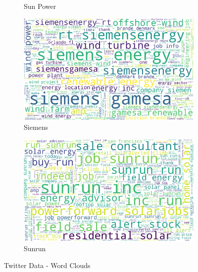 \documentclass[sigconf, nonacm]{acmart}
\begin{document}
\begin{figure}[H]
\begin{subfigure}{0.25\linewidth}
  \caption{Sun Power}
  \label{fig:sfig4}
\end{subfigure}
\begin{subfigure}{0.25\linewidth}
  \centering
  \includegraphics[width=1\linewidth]{images/siemens_gamesa_wordcloud.png}
  \caption{Siemens}
  \label{fig:sfig5}
\end{subfigure}
\begin{subfigure}{0.25\linewidth}
  \centering
  \includegraphics[width=1\linewidth]{images/sunrun_wordcloud.png}
  \caption{Sunrun}
  \label{fig:sfig6}
\end{subfigure}
\caption{Twitter Data - Word Clouds  }
\label{fig:fig}
\end{figure}
\end{document}

